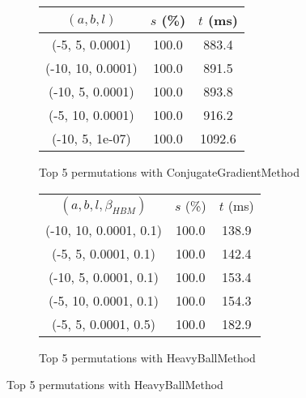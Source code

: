 \begin{figure}[H]
\begin{subfigure}[ht]{.5\textwidth}
\begin{tabular}{|c|c|c|}
\rowcolor{gray!25}
$(a,b,l)$ & $s$ (\%) & $t$ (ms) \\
\hline
(-5, 5, 0.0001) & 100.0 & 883.4 \\
(-10, 10, 0.0001) & 100.0 & 891.5 \\
(-10, 5, 0.0001) & 100.0 & 893.8 \\
(-5, 10, 0.0001) & 100.0 & 916.2 \\
(-10, 5, 1e-07) & 100.0 & 1092.6 \\
\hline
\end{tabular}
\caption{Top 5 permutations with ConjugateGradientMethod}
\label{subfig:param_comp_NegativeEntropy_ConjugateGradientMethod_BisectionSearch}
\end{subfigure}
\hfill
\begin{subfigure}[ht]{.5\textwidth}
\begin{tabular}{|c|c|c|}
\hline
\rowcolor{gray!25}
\multicolumn{3}{|c|}{HeavyBallMethod} \\
\hline
\rowcolor{gray!25}
$(a,b,l,\beta_{HBM})$ & $s$ (\%) & $t$ (ms) \\
\hline
(-10, 10, 0.0001, 0.1) & 100.0 & 138.9 \\
(-5, 5, 0.0001, 0.1) & 100.0 & 142.4 \\
(-10, 5, 0.0001, 0.1) & 100.0 & 153.4 \\
(-5, 10, 0.0001, 0.1) & 100.0 & 154.3 \\
(-5, 5, 0.0001, 0.5) & 100.0 & 182.9 \\
\hline
\end{tabular}
\caption{Top 5 permutations with HeavyBallMethod}
\label{subfig:param_comp_NegativeEntropy_HeavyBallMethod_BisectionSearch}
\end{subfigure}
\end{figure}